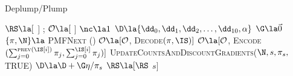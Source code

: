 \begin{algorithm}[t!]
    \caption{Deplump/Plump} \label{alg:deplump/plump}
    \begin{algorithmic}[1]
		\State $\RS \la [$ $]$ ;  $\mathcal{O} \la  [$ $]$ 
		\State $\nc \la 1$ 
		\State $\D \la  \{ \dd_0, \dd_1, \dd_2, \dots, \dd_{10}, \alpha \}$ 
			\State $\G \la \vec 0$ 
			\State $ \{ \pi, \N  \} \la$  \textsc{PMFNext} (\RS)
				\State $\mathcal{O} \la [\mathcal{O}$,  \textsc{Decode}$(\pi, \IS)]$
			\Else
				\State $\mathcal{O}\la [\mathcal{O}$,   \textsc{Encode}$(\sum_{j= 0}^{\textsc{prev}(\IS[i])} \pi_j, \sum_{j = 0}^{\IS[i]} \pi_j)]$		
			\EndIf
			\State \textsc{UpdateCountsAndDiscountGradients}($\N,s,\pi_s,$TRUE)
			\State $\D \la \D + \G \eta / \pi_s$ 
			\State $\RS \la [\RS$ $s]$ 
		\EndFor
	\EndProcedure
	\end{algorithmic}
\end{algorithm}

